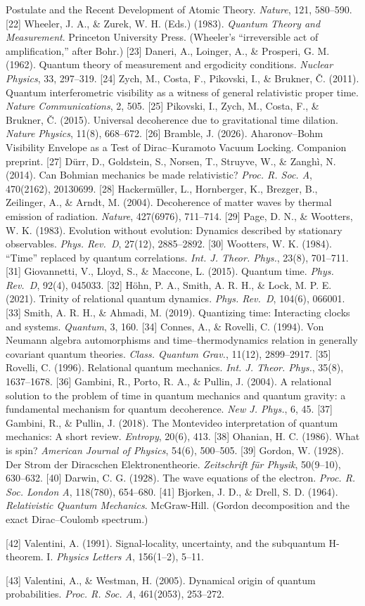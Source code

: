 \documentclass[
]{article}
\begin{document}
Postulate and the Recent Development of Atomic Theory. \emph{Nature},
121, 580--590. {[}22{]} Wheeler, J. A., \& Zurek, W. H. (Eds.) (1983).
\emph{Quantum Theory and Measurement}. Princeton University Press.
(Wheeler's ``irreversible act of amplification,'' after Bohr.) {[}23{]}
Daneri, A., Loinger, A., \& Prosperi, G. M. (1962). Quantum theory of
measurement and ergodicity conditions. \emph{Nuclear Physics}, 33,
297--319. {[}24{]} Zych, M., Costa, F., Pikovski, I., \& Brukner, Č.
(2011). Quantum interferometric visibility as a witness of general
relativistic proper time. \emph{Nature Communications}, 2, 505. {[}25{]}
Pikovski, I., Zych, M., Costa, F., \& Brukner, Č. (2015). Universal
decoherence due to gravitational time dilation. \emph{Nature Physics},
11(8), 668--672. {[}26{]} Bramble, J. (2026). Aharonov--Bohm Visibility
Envelope as a Test of Dirac--Kuramoto Vacuum Locking. Companion
preprint. {[}27{]} Dürr, D., Goldstein, S., Norsen, T., Struyve, W., \&
Zanghì, N. (2014). Can Bohmian mechanics be made relativistic?
\emph{Proc. R. Soc. A}, 470(2162), 20130699. {[}28{]} Hackermüller, L.,
Hornberger, K., Brezger, B., Zeilinger, A., \& Arndt, M. (2004).
Decoherence of matter waves by thermal emission of radiation.
\emph{Nature}, 427(6976), 711--714. {[}29{]} Page, D. N., \& Wootters,
W. K. (1983). Evolution without evolution: Dynamics described by
stationary observables. \emph{Phys. Rev.~D}, 27(12), 2885--2892.
{[}30{]} Wootters, W. K. (1984). ``Time'' replaced by quantum
correlations. \emph{Int. J. Theor. Phys.}, 23(8), 701--711. {[}31{]}
Giovannetti, V., Lloyd, S., \& Maccone, L. (2015). Quantum time.
\emph{Phys. Rev.~D}, 92(4), 045033. {[}32{]} Höhn, P. A., Smith, A. R.
H., \& Lock, M. P. E. (2021). Trinity of relational quantum dynamics.
\emph{Phys. Rev.~D}, 104(6), 066001. {[}33{]} Smith, A. R. H., \&
Ahmadi, M. (2019). Quantizing time: Interacting clocks and systems.
\emph{Quantum}, 3, 160. {[}34{]} Connes, A., \& Rovelli, C. (1994). Von
Neumann algebra automorphisms and time--thermodynamics relation in
generally covariant quantum theories. \emph{Class. Quantum Grav.},
11(12), 2899--2917. {[}35{]} Rovelli, C. (1996). Relational quantum
mechanics. \emph{Int. J. Theor. Phys.}, 35(8), 1637--1678. {[}36{]}
Gambini, R., Porto, R. A., \& Pullin, J. (2004). A relational solution
to the problem of time in quantum mechanics and quantum gravity: a
fundamental mechanism for quantum decoherence. \emph{New J. Phys.}, 6,
45. {[}37{]} Gambini, R., \& Pullin, J. (2018). The Montevideo
interpretation of quantum mechanics: A short review. \emph{Entropy},
20(6), 413. {[}38{]} Ohanian, H. C. (1986). What is spin? \emph{American
Journal of Physics}, 54(6), 500--505. {[}39{]} Gordon, W. (1928). Der
Strom der Diracschen Elektronentheorie. \emph{Zeitschrift für Physik},
50(9--10), 630--632. {[}40{]} Darwin, C. G. (1928). The wave equations
of the electron. \emph{Proc. R. Soc. London A}, 118(780), 654--680.
{[}41{]} Bjorken, J. D., \& Drell, S. D. (1964). \emph{Relativistic
Quantum Mechanics}. McGraw-Hill. (Gordon decomposition and the exact
Dirac--Coulomb spectrum.)

{[}42{]} Valentini, A. (1991). Signal-locality, uncertainty, and the
subquantum H-theorem. I. \emph{Physics Letters A}, 156(1--2), 5--11.

{[}43{]} Valentini, A., \& Westman, H. (2005). Dynamical origin of
quantum probabilities. \emph{Proc. R. Soc. A}, 461(2053), 253--272.
\end{document}
